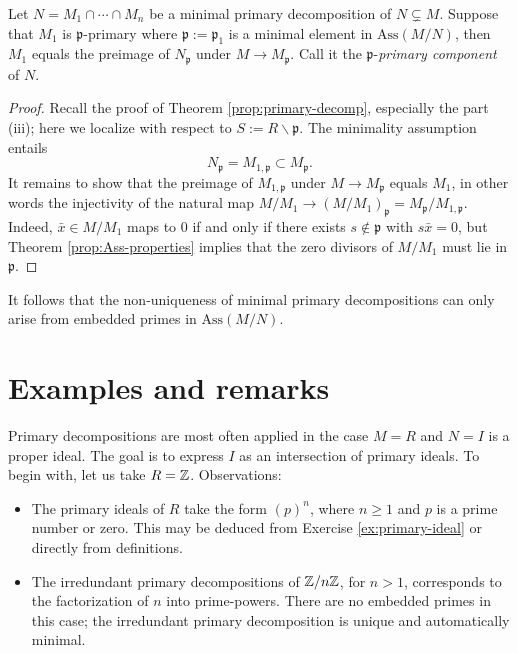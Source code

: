 \begin{corollary}\label{prop:p-primary-component}
	Let $N = M_1 \cap \cdots \cap M_n$ be a minimal primary decomposition of $N \subsetneq M$. Suppose that $M_1$ is $\mathfrak{p}$-primary where $\mathfrak{p} := \mathfrak{p}_1$ is a minimal element in $\mathrm{Ass}(M/N)$, then $M_1$ equals the preimage of $N_{\mathfrak{p}}$ under $M \to M_{\mathfrak{p}}$. Call it the $\mathfrak{p}$-\emph{primary component} of $N$.
\end{corollary}
\begin{proof}
	Recall the proof of Theorem \ref{prop:primary-decomp}, especially the part (iii); here we localize with respect to $S := R \smallsetminus \mathfrak{p}$. The minimality assumption entails
	\[ N_{\mathfrak{p}} = M_{1, \mathfrak{p}} \subset M_{\mathfrak{p}}. \]
	It remains to show that the preimage of $M_{1, \mathfrak{p}}$ under $M \to M_{\mathfrak{p}}$ equals $M_1$, in other words the injectivity of the natural map $M/M_1 \to (M/M_1)_{\mathfrak{p}} = M_{\mathfrak{p}}/M_{1, \mathfrak{p}}$. Indeed, $\bar{x} \in M/M_1$ maps to $0$ if and only if there exists $s \notin \mathfrak{p}$ with $s\bar{x}=0$, but Theorem \ref{prop:Ass-properties} implies that the zero divisors of $M/M_1$ must lie in $\mathfrak{p}$.
\end{proof}

It follows that the non-uniqueness of minimal primary decompositions can only arise from embedded primes in $\text{Ass}(M/N)$.

\section{Examples and remarks}
Primary decompositions are most often applied in the case $M = R$ and $N = I$ is a proper ideal. The goal is to express $I$ as an intersection of primary ideals. To begin with, let us take $R = \mathbb{Z}$. Observations:
\begin{itemize}
	\item The primary ideals of $R$ take the form $(p)^n$, where $n \geq 1$ and $p$ is a prime number or zero. This may be deduced from Exercise \ref{ex:primary-ideal} or directly from definitions.
	\item The irredundant primary decompositions of $\mathbb{Z}/n\mathbb{Z}$, for $n > 1$, corresponds to the factorization of $n$ into prime-powers. There are no embedded primes in this case; the irredundant primary decomposition is unique and automatically minimal.
\end{itemize}

